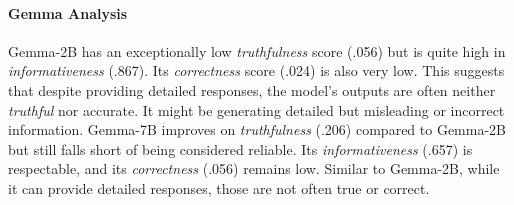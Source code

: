 \paragraph{Gemma Analysis}
Gemma-2B has an exceptionally low \textit{truthfulness} score (.056) but is quite high in \textit{informativeness} (.867). Its \textit{correctness} score (.024) is also very low. This suggests that despite providing detailed responses, the model's outputs are often neither \textit{truthful} nor accurate. It might be generating detailed but misleading or incorrect information.
Gemma-7B improves on \textit{truthfulness} (.206) compared to Gemma-2B but still falls short of being considered reliable. Its \textit{informativeness} (.657) is respectable, and its \textit{correctness} (.056) remains low. Similar to Gemma-2B, while it can provide detailed responses, those are not often true or correct.


















